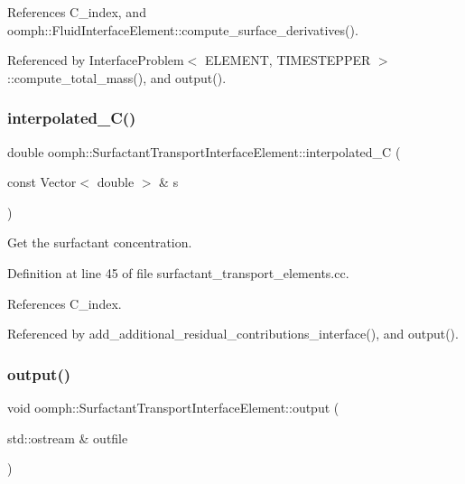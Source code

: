 References C\+\_\+index, and oomph\+::\+Fluid\+Interface\+Element\+::compute\+\_\+surface\+\_\+derivatives().



Referenced by Interface\+Problem$<$ E\+L\+E\+M\+E\+N\+T, T\+I\+M\+E\+S\+T\+E\+P\+P\+E\+R $>$\+::compute\+\_\+total\+\_\+mass(), and output().

\mbox{\label{classoomph_1_1SurfactantTransportInterfaceElement_a9da12df06b20e5f1ce0736acfc7e8d83}} 
\subsubsection{\texorpdfstring{interpolated\+\_\+\+C()}{interpolated\_C()}}
{\footnotesize\ttfamily double oomph\+::\+Surfactant\+Transport\+Interface\+Element\+::interpolated\+\_\+C (\begin{DoxyParamCaption}\item[{const Vector$<$ double $>$ \&}]{s }\end{DoxyParamCaption})\hspace{0.3cm}{\ttfamily [protected]}}



Get the surfactant concentration. 



Definition at line 45 of file surfactant\+\_\+transport\+\_\+elements.\+cc.



References C\+\_\+index.



Referenced by add\+\_\+additional\+\_\+residual\+\_\+contributions\+\_\+interface(), and output().

\mbox{\label{classoomph_1_1SurfactantTransportInterfaceElement_a280f065d9cb85438c0fe4f7cd95d14b3}} 
\subsubsection{\texorpdfstring{output()}{output()}\hspace{0.1cm}{\footnotesize\ttfamily [1/4]}}
{\footnotesize\ttfamily void oomph\+::\+Surfactant\+Transport\+Interface\+Element\+::output (\begin{DoxyParamCaption}\item[{std\+::ostream \&}]{outfile }\end{DoxyParamCaption})\hspace{0.3cm}{\ttfamily [inline]}}




